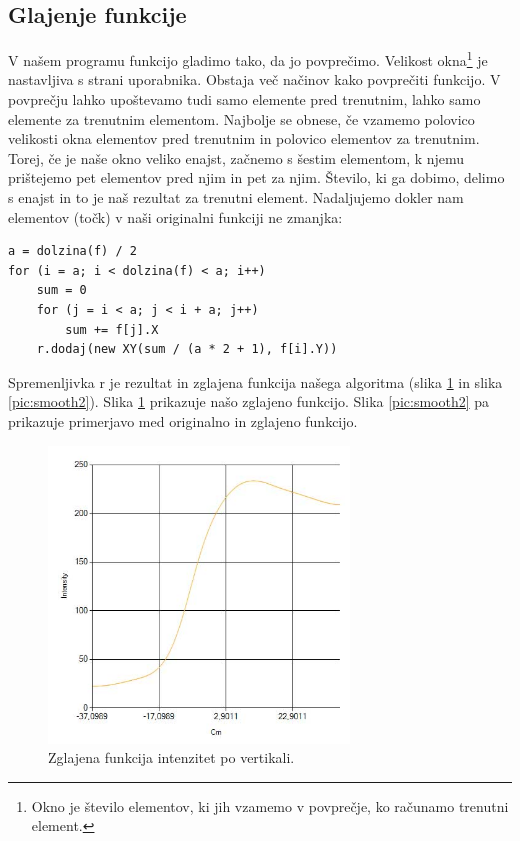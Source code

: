 \documentclass[oneside, a4paper, 12pt]{book}
\begin{document}
\subsection{Glajenje funkcije}
V našem programu funkcijo gladimo tako, da jo povprečimo. Velikost okna\footnote{Okno je število elementov, ki jih vzamemo v povprečje, ko računamo trenutni element.} je nastavljiva s strani uporabnika. Obstaja več načinov kako povprečiti funkcijo. V povprečju lahko upoštevamo tudi samo elemente pred trenutnim, lahko samo elemente za trenutnim elementom. Najbolje se obnese, če vzamemo polovico velikosti okna elementov pred trenutnim in polovico elementov za trenutnim. Torej, če je naše okno veliko enajst, začnemo s šestim elementom, k njemu prištejemo pet elementov pred njim in pet za njim. Število, ki ga dobimo, delimo s enajst in to je naš rezultat za trenutni element. Nadaljujemo dokler nam elementov (točk) v naši originalni funkciji ne zmanjka:
\begin{samepage}
\begin{verbatim}
a = dolzina(f) / 2
for (i = a; i < dolzina(f) < a; i++)
    sum = 0
    for (j = i < a; j < i + a; j++)
        sum += f[j].X
    r.dodaj(new XY(sum / (a * 2 + 1), f[i].Y))
\end{verbatim}
\end{samepage}
Spremenljivka r je rezultat in zglajena funkcija našega algoritma (slika \ref{pic:smooth1} in slika \ref{pic:smooth2}).
Slika \ref{pic:smooth1} prikazuje našo zglajeno funkcijo. Slika \ref{pic:smooth2} pa prikazuje primerjavo med originalno in zglajeno funkcijo.

\begin{figure}
\begin{center}
\includegraphics[width=8cm]{slike/glajena-funkcija.jpg}
\end{center}
\caption{Zglajena funkcija intenzitet po vertikali.}
\label{pic:smooth1}
\end{figure}
\end{document}
